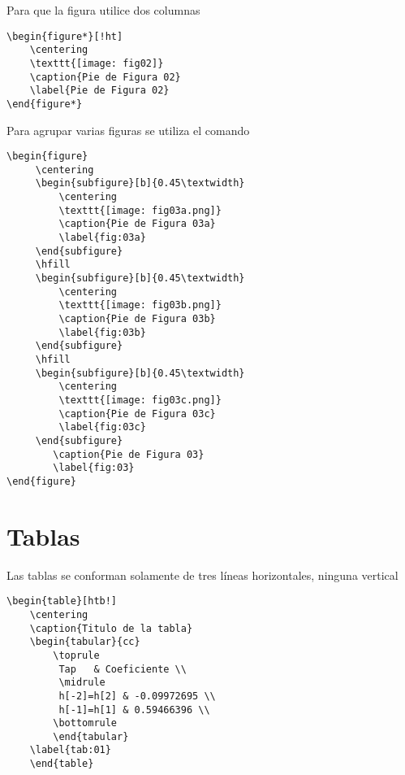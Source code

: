 \documentclass[12pt]{difu100cia} %
\begin{document}
Para que la figura utilice dos columnas 

\begin{lstlisting}[basicstyle=\small]
    \begin{figure*}[!ht]
	\centering
	\texttt{[image: fig02]}
	\caption{Pie de Figura 02}
	\label{Pie de Figura 02}
\end{figure*}
\end{lstlisting}

Para agrupar varias figuras se utiliza el comando 

\begin{lstlisting}[basicstyle=\small]
    \begin{figure}
     \centering
     \begin{subfigure}[b]{0.45\textwidth}
         \centering
         \texttt{[image: fig03a.png]}
         \caption{Pie de Figura 03a}
         \label{fig:03a}
     \end{subfigure}
     \hfill
     \begin{subfigure}[b]{0.45\textwidth}
         \centering
         \texttt{[image: fig03b.png]}
         \caption{Pie de Figura 03b}
         \label{fig:03b}
     \end{subfigure}
     \hfill
     \begin{subfigure}[b]{0.45\textwidth}
         \centering
         \texttt{[image: fig03c.png]}
         \caption{Pie de Figura 03c}
         \label{fig:03c}
     \end{subfigure}
        \caption{Pie de Figura 03}
        \label{fig:03}
\end{figure}
\end{lstlisting}

\section{Tablas}

Las tablas se conforman solamente de tres líneas horizontales, ninguna vertical

\begin{lstlisting}[basicstyle=\small]
\begin{table}[htb!]
    \centering
    \caption{Titulo de la tabla} 
    \begin{tabular}{cc} 
        \toprule
         Tap   & Coeficiente \\ 
         \midrule
         h[-2]=h[2] & -0.09972695 \\
         h[-1]=h[1] & 0.59466396 \\
        \bottomrule
        \end{tabular}
    \label{tab:01}
    \end{table}
\end{lstlisting}
\end{document}
